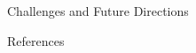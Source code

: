 \documentclass[final]{beamer}
\newlength{\onecolwid}
\begin{document}
\begin{frame}[t]
\begin{columns}[t]
\begin{column}{\onecolwid}
\begin{block}{Challenges and Future Directions}
\end{block}



\begin{block}{References}

\nocite{*} %
\small{
\printbibliography\vspace{0.75in}}

\end{block}

\end{column} %

\end{columns} %

\end{frame} %
\end{document}
